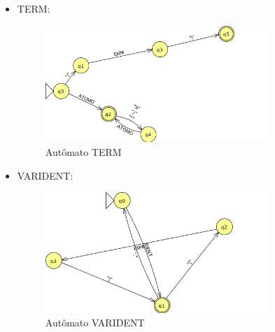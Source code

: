 \begin{itemize}
	\item TERM:
	\begin{figure}[H]
		\centering 
		\includegraphics[width=0.8\textwidth]{images/submaquinas/TERM.png}  
		\caption{Autômato TERM}
	\end{figure}
	
	\item VARIDENT:
	\begin{figure}[H]
		\centering 
		\includegraphics[width=0.8\textwidth]{images/submaquinas/VARIDENT.png}  
		\caption{Autômato VARIDENT}
	\end{figure}

\end{itemize}

